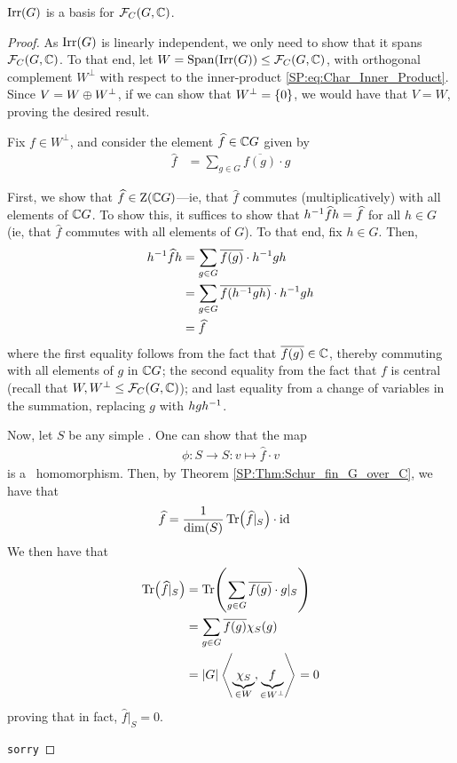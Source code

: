\begin{boxtheorem}
    $\operatorname{Irr}\!\left( G \right)$ is a basis for $\mathcal{F}_C\!\left( G, \mathbb{C} \right)$.
\end{boxtheorem}
\begin{proof}
    As $\operatorname{Irr}\!\left( G \right)$ is linearly independent, we only need to show that it spans $\mathcal{F}_C\!\left( G, \mathbb{C} \right)$. To that end, let $W = \operatorname{Span}\!\left( \operatorname{Irr}\!\left( G \right) \right) \leq \mathcal{F}_C\!\left( G, \mathbb{C} \right)$, with orthogonal complement $W^\perp$ with respect to the inner-product \eqref{SP:eq:Char_Inner_Product}. Since $V = W \oplus W^\perp$, if we can show that $W^\perp = \left\{ 0 \right\}$, we would have that $V = W$, proving the desired result.

    Fix $f \in W^\perp$, and consider the element $\widehat{f} \in \mathbb{C} G$ given by  %
    \begin{align*}
        \hat{f} &= \sum_{g \in G} \overline{f(g)} \cdot g
    \end{align*}

    First, we show that $\widehat{f} \in \operatorname{Z}\!\left( \mathbb{C} G \right)$---ie, that $\hat{f}$ commutes (multiplicatively) with all elements of $\mathbb{C} G$. To show this, it suffices to show that $h^{-1} \widehat{f} h = \widehat{f}$ for all $h \in G$ (ie, that $\hat{f}$ commutes with all elements of $G$). To that end, fix $h \in G$. Then,
    \begin{align*}
        h\inv \hat{f} h &=
        \sum_{g \in G} \overline{f(g)} \cdot h\inv g h \\
        &= \sum_{g \in G} \overline{\fof{h\inv g h}} \cdot h\inv g h \\ %
        &= \hat{f}
    \end{align*}
    where the first equality follows from the fact that $\overline{f(g)} \in \mathbb{C}$, thereby commuting with all elements of $g$ in $\mathbb{C} G$; the second equality from the fact that $f$ is central (recall that $W, W^{\perp} \leq \mathcal{F}_C\!\left( G, \mathbb{C} \right)$); and last equality from a change of variables in the summation, replacing $g$ with $hgh^{-1}$.

    Now, let $S$ be any simple \CGM. One can show that the map
    \begin{align*}
        \phi : S \to S : v \mapsto \hat{f} \cdot v
    \end{align*}
    is a \CGM\ homomorphism. %
    Then, by Theorem \ref{SP:Thm:Schur_fin_G_over_C}, we have that %
    \begin{align*}
        \widehat{f} &= \frac{1}{\dim\!\left( S \right)} \operatorname{Tr}\!\left( \widehat{f}\vert_S \right) \cdot \operatorname{id}
    \end{align*}
    We then have that
    \begin{align*}
        \operatorname{Tr}\!\left( \widehat{f}\vert_S \right) &= \operatorname{Tr}\!\left( \sum_{g \in G} \overline{f(g)} \cdot g\vert_{S} \right) \\
        &= \sum_{g \in G} \overline{f(g)} \chi_S(g) \\
        &= \left\lvert G \right\rvert \left\langle \underbrace{\chi_S}_{\in W}, \underbrace{f}_{\in W^\perp} \right\rangle = 0
    \end{align*}
    proving that in fact, $\hat{f}\vert_S = 0$.
    
    \verb|sorry| %
\end{proof}